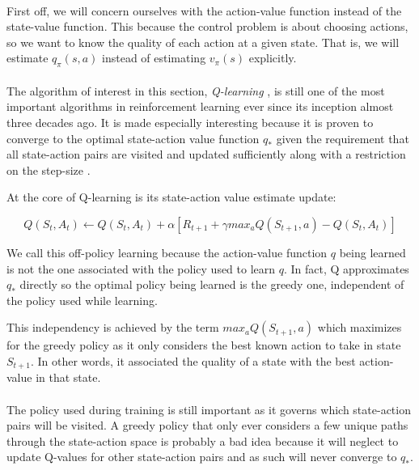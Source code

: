\paragraph{}
First off, we will concern ourselves with
the action-value function instead of the state-value function.
This because the control problem
is about choosing actions,
so we want to know the quality of each action
at a given state.
That is, we will estimate $q_\pi(s,a)$
instead of estimating $v_\pi(s)$ explicitly.

\paragraph{}
The algorithm of interest in this section,
\textit{Q-learning} \parencite{watkins1989learning},
is still one of the most important algorithms
in reinforcement learning
ever since its inception almost three decades ago.
It is made especially interesting because
it is proven to converge
to the optimal state-action value function $q_*$
given the requirement that all state-action pairs
are visited and updated sufficiently
along with a restriction on the step-size
\parencite{watkins1992q}.

At the core of Q-learning is its state-action value estimate update:

\begin{equation}
  \label{eq:qlearning}
  Q(S_t, A_t) \leftarrow Q(S_t, A_t) + \alpha \left[ R_{t+1} + \gamma max_a Q(S_{t+1}, a) - Q(S_t, A_t) \right]
\end{equation}

We call this off-policy learning because
the action-value function $q$ being learned
is not the one associated with the policy used to learn $q$.
In fact, Q approximates $q_*$ directly
so the optimal policy being learned is the greedy one,
independent of the policy used while learning.

This independency is achieved by the term
$max_aQ(S_{t+1},a)$
which maximizes for the greedy policy
as it only considers the best known action to take
in state $S_{t+1}$.
In other words, it associated the quality of a state
with the best action-value in that state.

\paragraph{}
The policy used during training is still important
as it governs which state-action pairs will be visited.
A greedy policy that only ever considers a few unique paths
through the state-action space
is probably a bad idea because it will neglect to update
Q-values for other state-action pairs
and as such will never converge to $q_*$.

